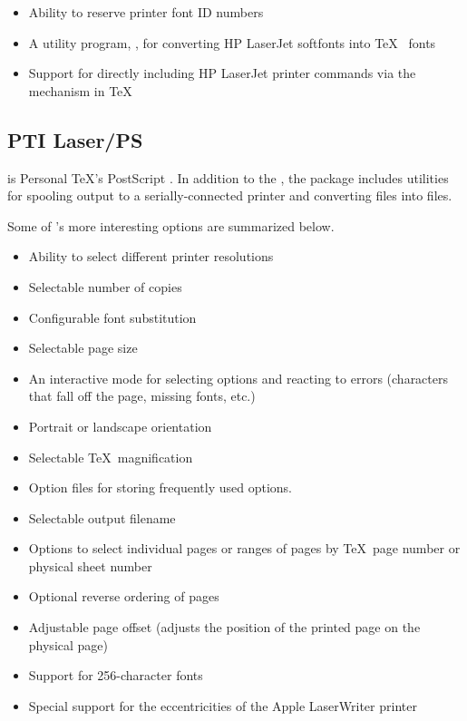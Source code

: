\begin{itemize}
  \item Ability to reserve printer font ID numbers
  \item A utility program, , for converting
        HP LaserJet softfonts into \TeX\  fonts
  \item Support for directly including HP LaserJet printer commands via
        the  mechanism in \TeX
\end{itemize}

\subsection{PTI Laser/PS}

 is Personal \TeX's PostScript \dvidriver.  
In addition to the \dvidriver, the  package
includes utilities for spooling output to a serially-connected printer
and converting  files into  files.

Some of 's more interesting options are summarized
below.  

\begin{itemize}
  \item Ability to select different printer resolutions
  \item Selectable number of copies
  \item Configurable font substitution
  \item Selectable page size
  \item An interactive mode for selecting options and reacting to errors
        (characters that fall off the page, missing fonts, etc.)
  \item Portrait or landscape orientation
  \item Selectable \TeX\ magnification
  \item Option files for storing frequently used options.
  \item Selectable output filename
  \item Options to select individual pages or ranges of pages by \TeX\
        page number or physical sheet number
  \item Optional reverse ordering of pages
  \item Adjustable page offset (adjusts the position of the printed page
        on the physical page)
  \item Support for 256-character fonts
  \item Special support for the eccentricities of the Apple LaserWriter
        printer
\end{itemize}

